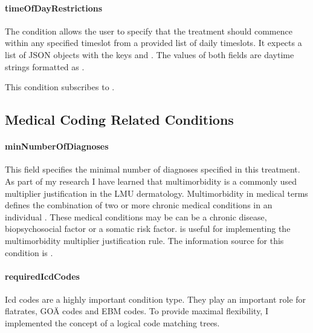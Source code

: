 \paragraph{timeOfDayRestrictions}
The  condition allows the user to specify that the treatment should commence within any specified timeslot from a provided list of daily timeslots.
It expects a list of JSON objects with the keys  and .
The values of both fields are daytime strings formatted as .

This condition subscribes to .

\subsection{Medical Coding Related Conditions}\label{subsec:medical-coding-related-conditions}
\paragraph{minNumberOfDiagnoses}
This field specifies the minimal number of diagnoses specified in this treatment.
As part of my research I have learned that multimorbidity is a commonly used multiplier justification in the LMU dermatology.
Multimorbidity in medical terms defines the combination of two or more chronic medical conditions in an individual \cite{Reste2013The}.
These medical conditions may be can be a chronic disease, biopsychosocial factor or a somatic risk factor.
\minNumberOfDiagnoses is useful for implementing the multimorbidity multiplier justification rule.
The information source for this condition is .

\paragraph{requiredIcdCodes}
Icd codes are a highly important condition type.
They play an important role for flatrates, GOÄ codes and EBM codes.
To provide maximal flexibility, I implemented the concept of a logical code matching trees.



